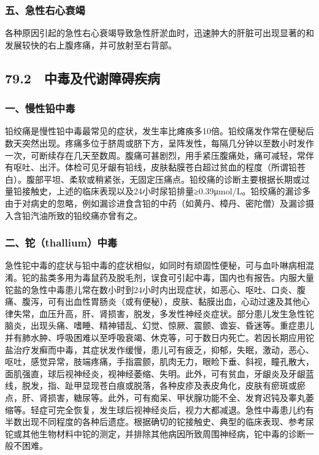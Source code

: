 \subsubsection{五、急性右心衰竭}

各种原因引起的急性右心衰竭导致急性肝淤血时，迅速肿大的肝脏可出现显著的和发展较快的右上腹疼痛，并可放射至右背部。

\subsection{79.2　中毒及代谢障碍疾病}

\subsubsection{一、慢性铅中毒}

铅绞痛是慢性铅中毒最常见的症状，发生率比瘫痪多10倍。铅绞痛发作常在便秘后数天突然出现。疼痛多位于脐周或脐下方，呈阵发性，每隔几分钟以至数小时发作一次，可断续存在几天至数周。腹痛可甚剧烈，用手紧压腹痛处，痛可减轻，常伴有呕吐、出汗。体检可见牙龈有铅线，皮肤黏膜苍白超过贫血的程度（所谓铅苍白）。腹部平坦、柔软或稍紧张，无固定压痛点。铅绞痛的诊断主要根据长期或过量铅接触史，上述的临床表现以及24小时尿铅排量≥0.39μmol/L。铅绞痛的漏诊多由于对病史的忽略，例如漏诊进食含铅的中药（如黄丹、樟丹、密陀僧）及漏诊摄入含铅汽油所致的铅绞痛亦曾有之。

\subsubsection{二、铊（thallium）中毒}

急性铊中毒的症状与铅中毒的症状相似，如同时有顽固性便秘，可与血卟啉病相混淆。铊的盐类多用为毒鼠药及脱毛剂，误食可引起中毒，国内也有报告。内服大量铊盐的急性中毒患儿常在数小时到24小时内出现症状，如恶心、呕吐、口炎、腹痛、腹泻，可有出血性胃肠炎（或有便秘），皮肤、黏膜出血，心动过速及其他心律失常，血压升高，肝、肾损害，脱发，多发性神经炎症状。部分患儿发生急性铊脑炎，出现头痛、嗜睡、精神错乱、幻觉、惊厥、震颤、谵妄、昏迷等。重症患儿并有肺水肿、呼吸困难以至呼吸衰竭、休克等，可于数日内死亡。若因长期应用铊盐治疗发癣而中毒，其症状发作缓慢，患儿可有疲乏，抑郁，失眠，激动，恶心、呕吐，感觉异常，肢端疼痛，手指震颤，肌肉无力，眼睑下垂、斜视，瞳孔散大，面肌强直，球后视神经炎，视神经萎缩、失明。此外，可有贫血，牙龈炎及牙龈蓝线，脱发，指、趾甲显现苍白痕或脱落，各种皮疹及表皮角化，皮肤有瘀斑或瘀点，肝、肾损害，糖尿等。此外，可有痴呆、甲状腺功能不全、发育迟钝及睾丸萎缩等。轻症可完全恢复，发生球后视神经炎后，视力大都减退。急性中毒患儿约有半数出现不同程度的各种后遗症。根据确切的铊接触史、典型的临床表现、参考尿铊或其他生物材料中铊的测定，并排除其他病因所致周围神经病，铊中毒的诊断一般不困难。

